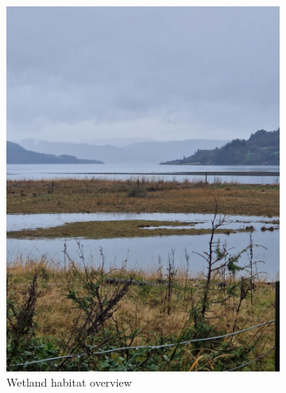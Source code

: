 \documentclass[twocolumn]{article}
\begin{document}
\begin{figure}[H]
\centering
\begin{subfigure}{0.45\textwidth}
\includegraphics[width=\textwidth]{01_wetland_landscape_mountains.jpg}
\caption{Wetland habitat overview}
\end{subfigure}
\hfill
\begin{subfigure}{0.45\textwidth}

\end{subfigure}
\end{figure}
\end{document}
